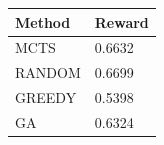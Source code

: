 \begin{tabular}{ll}
\hline
Method & Reward \\
\hline
  MCTS & 0.6632 \\
  RANDOM & 0.6699 \\
  GREEDY & 0.5398 \\
  GA & 0.6324 \\
\hline
\end{tabular}
